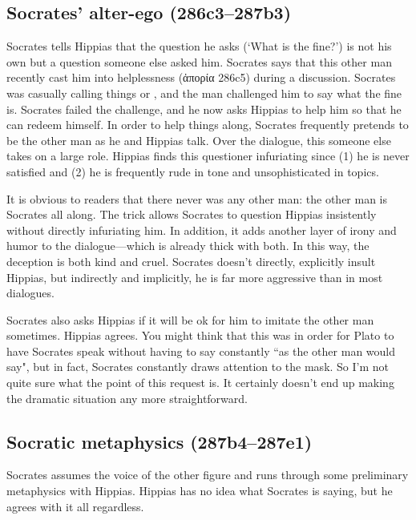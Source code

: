 \documentclass[11pt]{article}
\begin{document}

\subsection{Socrates' alter-ego (286c3--287b3)}

Socrates tells Hippias that the question he asks (`What is the fine?') is not
his own but a question someone else asked him.  Socrates says that this other
man recently cast him into helplessness ({\g ἀπορία} 286c5) during
a discussion.  Socrates was casually calling things  or
, and the man challenged him to say what the fine is.  Socrates
failed the challenge, and he now asks Hippias to help him so that he can redeem
himself.  In order to help things along, Socrates frequently pretends to be the
other man as he and Hippias talk.  Over the dialogue, this someone else takes
on a large role.  Hippias finds this questioner infuriating since (1) he is
never satisfied and (2) he is frequently rude in tone and unsophisticated in
topics.

It is obvious to readers that there never was any other man: the other man is
Socrates all along.  The trick allows Socrates to question Hippias insistently
without directly infuriating him.  In addition, it adds another layer of irony
and humor to the dialogue---which is already thick with both.  In this way, the
deception is both kind and cruel.  Socrates doesn't directly, explicitly insult
Hippias, but indirectly and implicitly, he is far more aggressive than in most
dialogues.

Socrates also asks Hippias if it will be ok for him to imitate the other man
sometimes.  Hippias agrees.  You might think that this was in order for Plato
to have Socrates speak without having to say constantly ``as the other man
would say", but in fact, Socrates constantly draws attention to the mask.  So
I'm not quite sure what the point of this request is.  It certainly doesn't end
up making the dramatic situation any more straightforward.


\subsection{Socratic metaphysics (287b4--287e1)}

Socrates assumes the voice of the other figure and runs through some
preliminary metaphysics with Hippias.  Hippias has no idea what Socrates is
saying, but he agrees with it all regardless.
\end{document}
